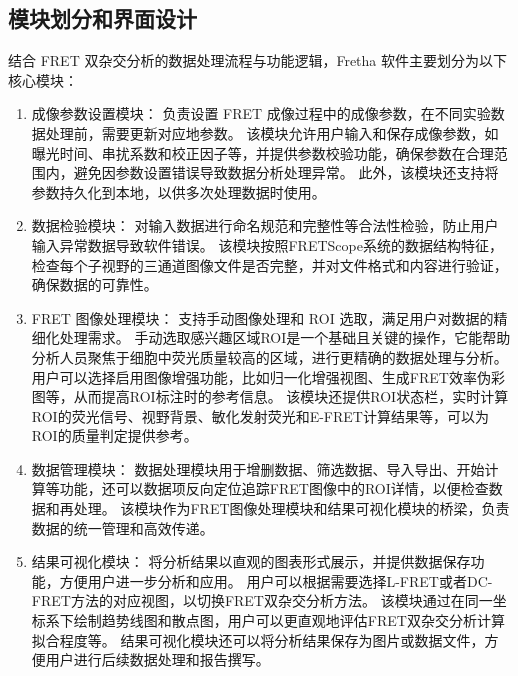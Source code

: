 \subsection{模块划分和界面设计}
结合 FRET 双杂交分析的数据处理流程与功能逻辑，Fretha 软件主要划分为以下核心模块：
\begin{enumerate}
  \item {成像参数设置模块：}
  负责设置 FRET 成像过程中的成像参数，在不同实验数据处理前，需要更新对应地参数。
  该模块允许用户输入和保存成像参数，如曝光时间、串扰系数和校正因子等，并提供参数校验功能，确保参数在合理范围内，避免因参数设置错误导致数据分析处理异常。
  此外，该模块还支持将参数持久化到本地，以供多次处理数据时使用。
  \item {数据检验模块：}
  对输入数据进行命名规范和完整性等合法性检验，防止用户输入异常数据导致软件错误。
  该模块按照FRETScope系统的数据结构特征，检查每个子视野的三通道图像文件是否完整，并对文件格式和内容进行验证，确保数据的可靠性。
  \item {FRET 图像处理模块：}
  支持手动图像处理和 ROI 选取，满足用户对数据的精细化处理需求。
  手动选取感兴趣区域ROI是一个基础且关键的操作，它能帮助分析人员聚焦于细胞中荧光质量较高的区域，进行更精确的数据处理与分析。
  用户可以选择启用图像增强功能，比如归一化增强视图、生成FRET效率伪彩图等，从而提高ROI标注时的参考信息。
  该模块还提供ROI状态栏，实时计算ROI的荧光信号、视野背景、敏化发射荧光和E-FRET计算结果等，可以为ROI的质量判定提供参考。
  \item {数据管理模块：}
  数据处理模块用于增删数据、筛选数据、导入导出、开始计算等功能，还可以数据项反向定位追踪FRET图像中的ROI详情，以便检查数据和再处理。
  该模块作为FRET图像处理模块和结果可视化模块的桥梁，负责数据的统一管理和高效传递。
  \item {结果可视化模块：}
  将分析结果以直观的图表形式展示，并提供数据保存功能，方便用户进一步分析和应用。
  用户可以根据需要选择L-FRET或者DC-FRET方法的对应视图，以切换FRET双杂交分析方法。
  该模块通过在同一坐标系下绘制趋势线图和散点图，用户可以更直观地评估FRET双杂交分析计算拟合程度等。
  结果可视化模块还可以将分析结果保存为图片或数据文件，方便用户进行后续数据处理和报告撰写。
  
\end{enumerate}

